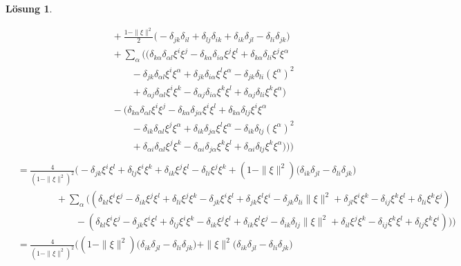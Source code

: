 \documentclass[paper=A4, twoside, chapterprefix=true, bibliography=totoc, headsepline]{scrbook}
\theoremstyle{plain}
\theoremstyle{nonumberplain}
\theoremstyle{empty}
\theoremstyle{break}
\newtheorem{Loes}{L\"osung}
\begin{document}
\begin{Loes}
\begin{enumerate}[label=\alph*), widest=b, leftmargin=*]
\begin{align*}
		&\qquad\qquad + \tfrac{1-\|\xi\|^2}{2}\big( - \delta_{jk} \delta_{il}+\delta_{lj}\delta_{ik}+\delta_{ik}\delta_{jl}-\delta_{li}\delta_{jk}\big)\\
		&\qquad \qquad + \sum_\alpha \big( ( \delta_{k\alpha} \delta_{\alpha l} \xi^i \xi^j-\delta_{k\alpha} \delta_{i \alpha}  \xi^j\xi^l+\delta_{k\alpha} \delta_{li} \xi^j \xi^\alpha\\
		&\qquad \qquad \qquad -\delta_{jk}\delta_{\alpha l} \xi^i\xi^{\alpha}+\delta_{jk}\delta_{i \alpha}\xi^l\xi^{\alpha} -\delta_{jk}\delta_{li}(\xi^{\alpha})^2\\
		&\qquad \qquad \qquad+ \delta_{\alpha j}\delta_{\alpha l} \xi^i \xi^k - \delta_{\alpha j}\delta_{i \alpha}\xi^k \xi^l + \delta_{\alpha j} \delta_{li}   \xi^k \xi^\alpha)\\
		& \qquad \qquad - (  \delta_{k\alpha} \delta_{\alpha l} \xi^i \xi^j-\delta_{k\alpha} \delta_{j \alpha}  \xi^i\xi^l+\delta_{k\alpha} \delta_{lj} \xi^i \xi^\alpha\\
		&\qquad \qquad \qquad -\delta_{ik}\delta_{\alpha l} \xi^j\xi^{\alpha}+\delta_{ik}\delta_{j \alpha}\xi^l\xi^{\alpha} -\delta_{ik}\delta_{lj}(\xi^{\alpha})^2\\
		&\qquad \qquad \qquad+ \delta_{\alpha i}\delta_{\alpha l} \xi^j \xi^k - \delta_{\alpha i}\delta_{j \alpha}\xi^k \xi^l + \delta_{\alpha i} \delta_{lj}  \xi^k \xi^\alpha)\big)\Big)\\
	\end{align*}
	\begin{align*}
		&= \tfrac{4}{(1-\|\xi\|^2)^2}\Big(- \delta_{jk}\xi^i \xi^l + \delta_{lj}\xi^i\xi^k+ \delta_{ik}\xi^j \xi^l - \delta_{li}\xi^j\xi^k + (1-\|\xi\|^2)\big(\delta_{ik}\delta_{jl}-\delta_{li}\delta_{jk}\big)\\
		&\qquad \qquad + \sum_\alpha \big( ( \delta_{k l} \xi^i \xi^j- \delta_{i k}  \xi^j\xi^l+ \delta_{li} \xi^j \xi^k -\delta_{jk} \xi^i\xi^{l}+\delta_{jk}\xi^l\xi^{i} -\delta_{jk}\delta_{li}\|\xi\|^2+ \delta_{j l} \xi^i \xi^k - \delta_{i j}\xi^k \xi^l + \delta_{li} \xi^k \xi^j)\\
		&\qquad \qquad \qquad - (  \delta_{k l} \xi^i \xi^j- \delta_{j k}  \xi^i\xi^l+ \delta_{lj} \xi^i \xi^k -\delta_{ik} \xi^j\xi^{l}+\delta_{ik}\xi^l\xi^{j} -\delta_{ik}\delta_{lj}\|\xi\|^2 + \delta_{i l} \xi^j \xi^k - \delta_{ij}\xi^k \xi^l + \delta_{lj} \xi^k \xi^i)\big)\Big)\\
		&=  \tfrac{4}{(1-\|\xi\|^2)^2}\Big( (1-\|\xi\|^2)\big(\delta_{ik}\delta_{jl}-\delta_{li}\delta_{jk}\big) +  \|\xi\|^2 \big(\delta_{ik}\delta_{jl}-\delta_{li}\delta_{jk}\big)\\

\end{align*}
\end{enumerate}
\end{Loes}
\end{document}
